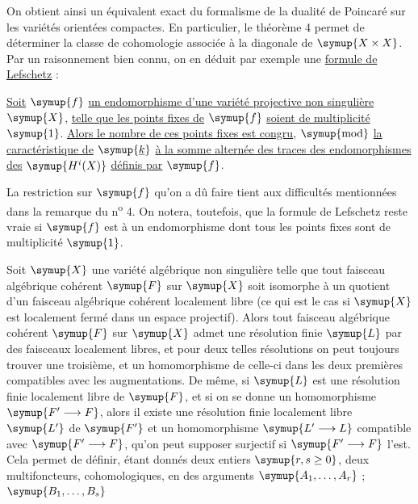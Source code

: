 On obtient ainsi un équivalent exact du formalisme de la dualité de Poincaré
sur les variétés orientées compactes. En particulier, le théorème 4 permet de
déterminer la classe de cohomologie associée à la diagonale de $\symup{X\times X}$. Par
un raisonnement bien connu, on en déduit par exemple une \uline{formule de Lefschetz} :

 \uline{Soit} $\symup{f}$ \uline{un endomorphisme d'une variété projective non
singulière} $\symup{X}$, \uline{telle que les points fixes de} $\symup{f}$ \uline{soient de multiplicité} $\symup{1}$.
\uline{Alors le nombre de ces points fixes est congru}, $\symup{\operatorname{mod}}$ \uline{la caractéristique de}
$\symup{\underline{k}}$ \uline{à la somme alternée des traces des endomorphismes des} $\symup{H^{i}(X)}$ \uline{définis
par} $\symup{f}$.

La restriction sur $\symup{f}$ qu'on a dû faire tient aux difficultés mentionnées dans
la remarque du n\textsuperscript{o} 4. On notera, toutefois, que la formule de
Lefschetz reste vraie si $\symup{f}$ est  à un endomorphisme dont tous les
points fixes sont de multiplicité $\symup{1}$.


Soit $\symup{X}$ une variété algébrique non singulière telle que tout faisceau
algébrique cohérent $\symup{F}$ sur $\symup{X}$ soit isomorphe à un quotient d'un faisceau
algébrique cohérent localement libre (ce qui est le cas si $\symup{X}$ est localement
fermé dans un espace projectif). Alors tout faisceau algébrique cohérent $\symup{F}$ sur
$\symup{X}$ admet une résolution finie $\symup{L}$ par des faisceaux localement libres, et pour
deux telles résolutions on peut toujours trouver une troisième, et un
homomorphisme de celle-ci dans les deux premières compatibles avec les
augmentations. De même, si $\symup{L}$ est une résolution finie localement libre de
$\symup{F}$, et si on se donne un homomorphisme $\symup{F'\longrightarrow F}$, alors il existe
une résolution finie localement libre $\symup{L'}$ de $\symup{F'}$ et un homomorphisme
$\symup{L'\longrightarrow L}$ compatible avec $\symup{F'\longrightarrow F}$, qu'on peut
supposer surjectif si $\symup{F'\longrightarrow F}$ l'est. Cela permet de définir, étant
donnés deux entiers $\symup{r,s\geq0}$, deux multifoncteurs, cohomologiques, en des
arguments $\symup{A_1,\ldots,A_r}$ ; $\symup{B_1,\ldots,B_s}$

